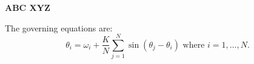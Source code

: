 \documentclass[12pt]{article}
\begin{document}
\textbf{ABC XYZ}

The governing equations are:
\[
\theta_i = \omega_i + \frac{K}{N} \sum_{j=1}^N \sin (\theta_j - \theta_i) \mbox{ where } i = 1, \ldots, N.
\]

\end{document}
